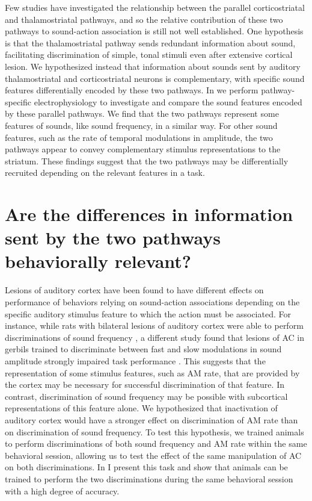 Few studies have investigated the relationship between the parallel corticostriatal and thalamostriatal pathways, and so the relative contribution of these two pathways to sound-action association is still not well established.
One hypothesis is that the thalamostriatal pathway sends redundant information about sound, facilitating discrimination of simple, tonal stimuli even after extensive cortical lesion.
We hypothesized instead that information about sounds sent by auditory thalamostriatal and corticostriatal neurons is complementary, with specific sound features differentially encoded by these two pathways.
In \ch{\Thstr} we perform pathway-specific electrophysiology to investigate and compare the sound features encoded by these parallel pathways.
%
We find that the two pathways represent some features of sounds, like sound frequency, in a similar way.
%
For other sound features, such as the rate of temporal modulations in amplitude, the two pathways appear to convey complementary stimulus representations to the striatum.
%
These findings suggest that the two pathways may be differentially recruited depending on the relevant features in a task. 

\section{Are the differences in information sent by the two pathways behaviorally relevant?}
Lesions of auditory cortex have been found to have different effects on performance of behaviors relying on sound-action associations depending on the specific auditory stimulus feature to which the action must be associated.
%
For instance, while rats with bilateral lesions of auditory cortex were able to perform discriminations of sound frequency \citep{Gimenez2015}, a different study found that lesions of AC in gerbils trained to discriminate between fast and slow modulations in sound amplitude strongly impaired task performance \citep{Deutscher2006}.
%
This suggests that the representation of some stimulus features, such as AM rate, that are provided by the cortex may be necessary for successful discrimination of that feature.
%
In contrast, discrimination of sound frequency may be possible with subcortical representations of this feature alone.
%
We hypothesized that inactivation of auditory cortex would have a stronger effect on discrimination of AM rate than on discrimination of sound frequency.
%
To test this hypothesis, we trained animals to perform discriminations of both sound frequency and AM rate within the same behavioral session, allowing us to test the effect of the same manipulation of AC on both discriminations.
In \ch{\Amod} I present this task and show that animals can be trained to perform the two discriminations during the same behavioral session with a high degree of accuracy.
%


